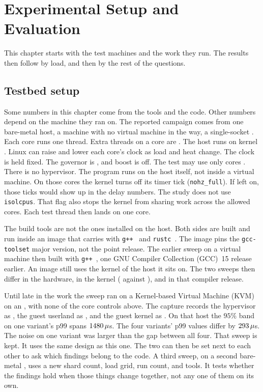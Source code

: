 \documentclass[english,oneside,a4paper,censored,csm,software-track-2020]{HYthesisML}
\begin{document}
\chapter{Experimental Setup and Evaluation\label{chapter:eval}}

This chapter starts with the test machines and the work they run. The results then follow by load, and then by the rest of the questions.

\section{Testbed setup\label{sec:testbed}}
Some numbers in this chapter come from the tools and the code.
Other numbers depend on the machine they ran on.
The reported campaign comes from one bare-metal host, a machine with no virtual machine in the way, a single-socket \MainCpu{}.
Each core runs one thread. Extra threads on a core are \MainSmt{}.
The host runs \MainHostDistro{} on kernel \MainKernel{}.
Linux can raise and lower each core's clock as load and heat change.
The clock is held fixed. The governor is \MainGovernor{}, and boost is off.
The test may use only cores \MainPinned{}. There is no hypervisor.
The program runs on the host itself, not inside a virtual machine.
On those cores the kernel turns off its timer tick (\texttt{nohz\_full}).
If left on, those ticks would show up in the delay numbers.
The study does not use \texttt{isolcpus}.
That flag also stops the kernel from sharing work across the allowed cores.
Each test thread then lands on one core.

The build tools are not the ones installed on the host.
Both sides are built and run inside an image that carries \MainDistro{} with \texttt{g++~\MainGpp} and \texttt{rustc~\MainRustc}.
The image pins the \texttt{gcc-toolset} major version, not the point release.
The earlier sweep on a virtual machine then built with \texttt{g++~\GuestGpp}, one GNU Compiler Collection (GCC)~15 release earlier.
An image still uses the kernel of the host it sits on.
The two sweeps then differ in the hardware, in the kernel (\MainKernel{} against \GuestKernel{}), and in that compiler release.

Until late in the work the sweep ran on a Kernel-based Virtual Machine (KVM) on an \GuestCpu{}, with none of the core controls above.
The capture records the hypervisor as \GuestVirt{}, the guest userland as \GuestDistro{}, and the guest kernel as \GuestKernel{}.
On that host the $95\%$ band on one variant's p99 spans $1480\,\mu$s.
The four variants' p99 values differ by $293\,\mu$s.
The noise on one variant was larger than the gap between all four.
That sweep is kept. It uses the same design as this one.
The two can then be set next to each other to ask which findings belong to the code.
A third sweep, on a second bare-metal \BmCpu{}, uses a new shard count, load grid, run count, and tools.
It tests whether the findings hold when those things change together, not any one of them on its own.
\end{document}
